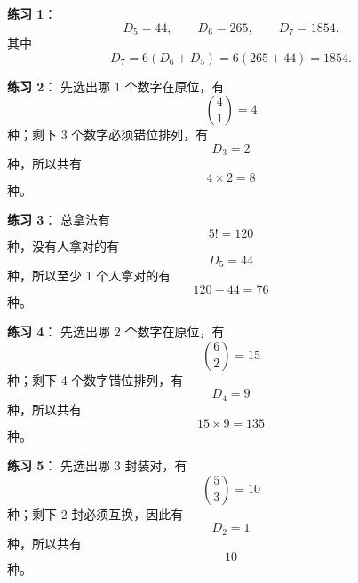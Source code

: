 \documentclass[11pt,a4paper,fontset=fandol]{ctexart}
\theoremstyle{formaltheorem}
\theoremstyle{formalexample}
\begin{document}
\textbf{练习 1}：
\[
D_5=44,\qquad D_6=265,\qquad D_7=1854.
\]
其中
\[
D_7=6(D_6+D_5)=6(265+44)=1854.
\]

\textbf{练习 2}：
先选出哪 1 个数字在原位，有
\[
\binom{4}{1}=4
\]
种；剩下 3 个数字必须错位排列，有
\[
D_3=2
\]
种，所以共有
\[
4\times 2=8
\]
种。

\textbf{练习 3}：
总拿法有
\[
5!=120
\]
种，没有人拿对的有
\[
D_5=44
\]
种，所以至少 1 个人拿对的有
\[
120-44=76
\]
种。

\textbf{练习 4}：
先选出哪 2 个数字在原位，有
\[
\binom{6}{2}=15
\]
种；剩下 4 个数字错位排列，有
\[
D_4=9
\]
种，所以共有
\[
15\times 9=135
\]
种。

\textbf{练习 5}：
先选出哪 3 封装对，有
\[
\binom{5}{3}=10
\]
种；剩下 2 封必须互换，因此有
\[
D_2=1
\]
种，所以共有
\[
10
\]
种。
\end{document}

